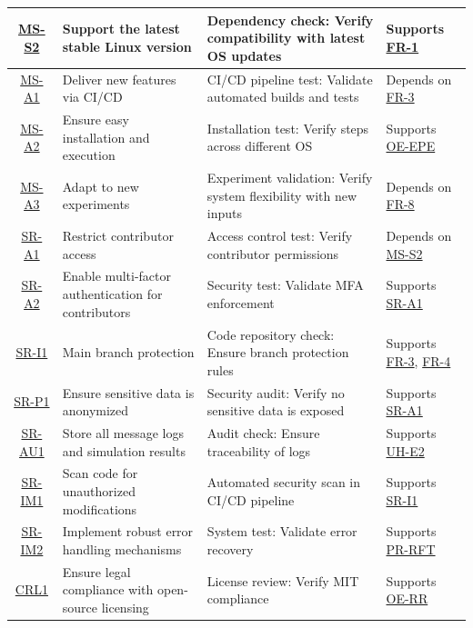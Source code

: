 \documentclass[12pt]{article}
\begin{document}
\begin{landscape}
\begin{longtable}{|c|p{6cm}|p{5cm}|p{4cm}|}
    \hline
    \hyperref[MS-S2]{MS-S2} & Support the latest stable Linux version & Dependency check: Verify compatibility with latest OS updates & Supports \hyperref[FR-1]{FR-1} \\
    \hline
    \hyperref[MS-A1]{MS-A1} & Deliver new features via CI/CD & CI/CD pipeline test: Validate automated builds and tests & Depends on \hyperref[FR-3]{FR-3} \\
    \hline
    \hyperref[MS-A2]{MS-A2} & Ensure easy installation and execution & Installation test: Verify steps across different OS & Supports \hyperref[OE-EPE]{OE-EPE} \\
    \hline
    \hyperref[MS-A3]{MS-A3} & Adapt to new experiments & Experiment validation: Verify system flexibility with new inputs & Depends on \hyperref[FR-8]{FR-8} \\
    \hline
    \hyperref[SR-A1]{SR-A1} & Restrict contributor access & Access control test: Verify contributor permissions & Depends on \hyperref[MS-S2]{MS-S2} \\
    \hline
    \hyperref[SR-A2]{SR-A2} & Enable multi-factor authentication for contributors & Security test: Validate MFA enforcement & Supports \hyperref[SR-A1]{SR-A1} \\
    \hline
    \hyperref[SR-I1]{SR-I1} & Main branch protection & Code repository check: Ensure branch protection rules & Supports \hyperref[FR-3]{FR-3}, \hyperref[FR-4]{FR-4} \\
    \hline
    \hyperref[SR-P1]{SR-P1} & Ensure sensitive data is anonymized & Security audit: Verify no sensitive data is exposed & Supports \hyperref[SR-A1]{SR-A1} \\
    \hline
    \hyperref[SR-AU1]{SR-AU1} & Store all message logs and simulation results & Audit check: Ensure traceability of logs & Supports \hyperref[UH-E2]{UH-E2} \\
    \hline
    \hyperref[SR-IM1]{SR-IM1} & Scan code for unauthorized modifications & Automated security scan in CI/CD pipeline & Supports \hyperref[SR-I1]{SR-I1} \\
    \hline
    \hyperref[SR-IM2]{SR-IM2} & Implement robust error handling mechanisms & System test: Validate error recovery & Supports \hyperref[PR-RFT]{PR-RFT} \\
    \hline
    \hyperref[CRL1]{CRL1} & Ensure legal compliance with open-source licensing & License review: Verify MIT compliance & Supports \hyperref[OE-RR]{OE-RR} \\
    \hline

\end{longtable}
\end{landscape}
\end{document}
